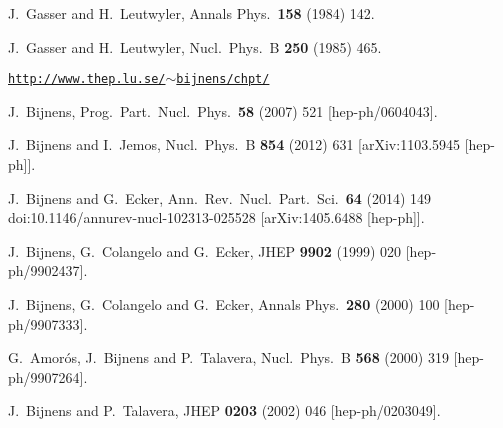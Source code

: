 \documentclass[12pt,a4paper]{article}
\begin{document}
\begin{thebibliography}{99}
  J.~Gasser and H.~Leutwyler,
  Annals Phys.\  {\bf 158} (1984) 142.

  J.~Gasser and H.~Leutwyler,
  Nucl.\ Phys.\ B {\bf 250} (1985) 465.

 \href{http://www.thep.lu.se/~bijnens/chpt/}{\tt http://www.thep.lu.se/$\sim$bijnens/chpt/}

  J.~Bijnens,
  Prog.\ Part.\ Nucl.\ Phys.\  {\bf 58} (2007) 521
  [hep-ph/0604043].

  J.~Bijnens and I.~Jemos,
  Nucl.\ Phys.\ B {\bf 854} (2012) 631
  [arXiv:1103.5945 [hep-ph]].

  J.~Bijnens and G.~Ecker,
  Ann.\ Rev.\ Nucl.\ Part.\ Sci.\  {\bf 64} (2014) 149
  doi:10.1146/annurev-nucl-102313-025528
  [arXiv:1405.6488 [hep-ph]].

  J.~Bijnens, G.~Colangelo and G.~Ecker,
  JHEP {\bf 9902} (1999) 020
  [hep-ph/9902437].

  J.~Bijnens, G.~Colangelo and G.~Ecker,
  Annals Phys.\  {\bf 280} (2000) 100
  [hep-ph/9907333].

  G.~Amor\'os, J.~Bijnens and P.~Talavera,
  Nucl.\ Phys.\ B {\bf 568} (2000) 319
  [hep-ph/9907264].

  J.~Bijnens and P.~Talavera,
  JHEP {\bf 0203} (2002) 046
  [hep-ph/0203049].


\end{thebibliography}
\end{document}
